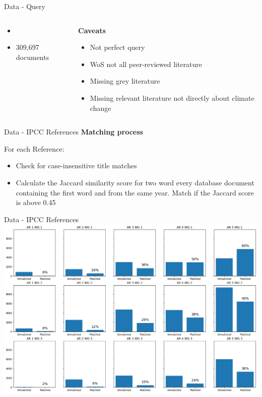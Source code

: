 \documentclass[9pt]{beamer}
\begin{document}
\begin{frame}{Data - Query}
\begin{columns}
\begin{column}{0.65\linewidth}
		\normalsize
		\begin{itemize}
			\item \citep{Haunschild2016}
			\item 309,697 documents
		\end{itemize}
	\end{column}
	\begin{column}{0.35\linewidth}
		\textbf{Caveats}
		\begin{itemize}
			\item Not perfect query
			\item WoS not all peer-reviewed literature
			\item Missing grey literature
			\item Missing relevant literature not directly about climate change
		\end{itemize}
	\end{column}
\end{columns}
\end{frame}

\begin{frame}{Data - IPCC References}
	\textbf{Matching process}
	
	\medskip
	
	For each Reference:
	\begin{itemize}
		\item Check for case-insensitive title matches
		\item Calculate the Jaccard similarity score for two word every database document containing the first word and from the same year. Match if the Jaccard score is above 0.45
	\end{itemize}
\end{frame}


\begin{frame}{Data - IPCC References}
		\includegraphics[width=\linewidth]{../plots/ipcc_matches}
\end{frame}
\end{document}
